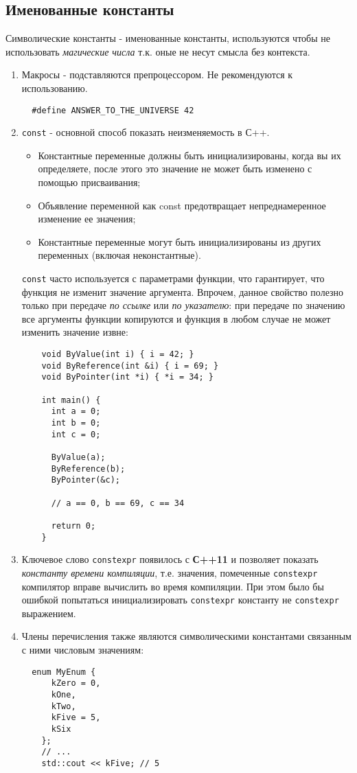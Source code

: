 \subsection{Именованные константы}
  
Символические константы - именованные константы, используются чтобы не
использовать \emph{магические числа} т.к. оные не несут смысла без
контекста.

\begin{enumerate}
\item
  Макросы - подставляются препроцессором. Не рекомендуются к
  использованию.
\begin{verbatim}
  #define ANSWER_TO_THE_UNIVERSE 42
\end{verbatim}
\item
  \texttt{const} - основной способ показать неизменяемость в С++.

  \begin{itemize}
  \item
    Константные переменные должны быть инициализированы, когда вы их
    определяете, после этого это значение не может быть изменено с
    помощью присваивания;
  \item
    Объявление переменной как const предотвращает непреднамеренное
    изменение ее значения;
  \item
    Константные переменные могут быть инициализированы из других
    переменных (включая неконстантные).
  \end{itemize}

  \texttt{const} часто используется с параметрами функции, что
  гарантирует, что функция не изменит значение аргумента. Впрочем,
  данное свойство полезно только при передаче \emph{по ссылке} или
  \emph{по указателю}: при передаче по значению все аргументы функции
  копируются и функция в любом случае не может изменить значение извне:
\begin{verbatim}
    void ByValue(int i) { i = 42; }
    void ByReference(int &i) { i = 69; }
    void ByPointer(int *i) { *i = 34; }

    int main() {
      int a = 0;
      int b = 0;
      int c = 0;

      ByValue(a);
      ByReference(b);
      ByPointer(&c);

      // a == 0, b == 69, c == 34

      return 0;
    }
\end{verbatim}
\item
  Ключевое слово \texttt{constexpr} появилось с \textbf{С++11} и
  позволяет показать \emph{константу времени компиляции}, т.е. значения,
  помеченные \texttt{constexpr} компилятор вправе вычислить во время
  компиляции. При этом было бы ошибкой попытаться инициализировать
  \texttt{constexpr} константу не \texttt{constexpr} выражением.
\item
  Члены перечисления также являются символическими константами связанным
  с ними числовым значениям:
\begin{verbatim}
  enum MyEnum {
      kZero = 0,
      kOne,
      kTwo,
      kFive = 5,
      kSix
    };
    // ...
    std::cout << kFive; // 5
\end{verbatim}
\end{enumerate}
